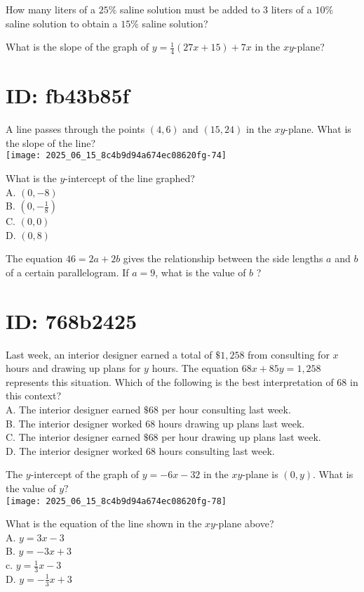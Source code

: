 How many liters of a $25 \%$ saline solution must be added to 3 liters of a $10 \%$ saline solution to obtain a $15 \%$ saline solution?

What is the slope of the graph of $y=\frac{1}{4}(27 x+15)+7 x$ in the $x y$-plane?

\section*{ID: fb43b85f}
A line passes through the points $(4,6)$ and $(15,24)$ in the $x y$-plane. What is the slope of the line?\\
\texttt{[image: 2025\_06\_15\_8c4b9d94a674ec08620fg-74]}

What is the $y$-intercept of the line graphed?\\
A. $(0,-8)$\\
B. $\left(0,-\frac{1}{8}\right)$\\
C. $(0,0)$\\
D. $(0,8)$

The equation $46=2 a+2 b$ gives the relationship between the side lengths $a$ and $b$ of a certain parallelogram. If $a=9$, what is the value of $b$ ?

\section*{ID: 768b2425}
Last week, an interior designer earned a total of $\$ 1,258$ from consulting for $x$ hours and drawing up plans for $y$ hours. The equation $68 x+85 y=1,258$ represents this situation. Which of the following is the best interpretation of 68 in this context?\\
A. The interior designer earned $\$ 68$ per hour consulting last week.\\
B. The interior designer worked 68 hours drawing up plans last week.\\
C. The interior designer earned $\$ 68$ per hour drawing up plans last week.\\
D. The interior designer worked 68 hours consulting last week.

The $y$-intercept of the graph of $y=-6 x-32$ in the $x y$-plane is $(0, y)$. What is the value of $y ?$\\
\texttt{[image: 2025\_06\_15\_8c4b9d94a674ec08620fg-78]}

What is the equation of the line shown in the $x y$-plane above?\\
A. $y=3 x-3$\\
B. $y=-3 x+3$\\
c. $y=\frac{1}{3} x-3$\\
D. $y=-\frac{1}{3} x+3$


